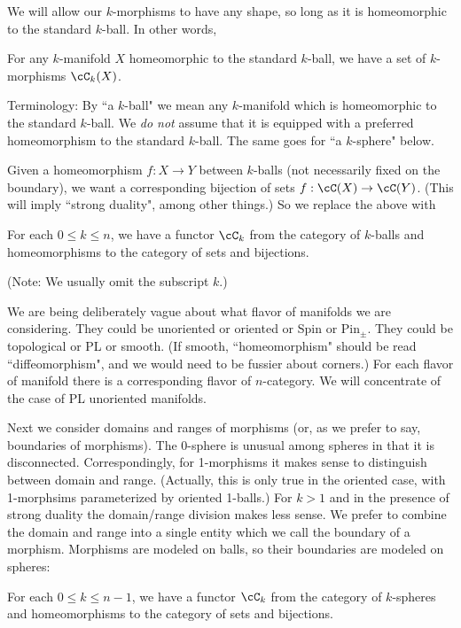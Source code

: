 We will allow our $k$-morphisms to have any shape, so long as it is homeomorphic to 
the standard $k$-ball.
In other words,

{For any $k$-manifold $X$ homeomorphic 
to the standard $k$-ball, we have a set of $k$-morphisms
$\cC_k(X)$.}

Terminology: By ``a $k$-ball" we mean any $k$-manifold which is homeomorphic to the 
standard $k$-ball.
We {\it do not} assume that it is equipped with a 
preferred homeomorphism to the standard $k$-ball.
The same goes for ``a $k$-sphere" below.


Given a homeomorphism $f:X\to Y$ between $k$-balls (not necessarily fixed on 
the boundary), we want a corresponding
bijection of sets $f:\cC(X)\to \cC(Y)$.
(This will imply ``strong duality", among other things.)
So we replace the above with

{For each $0 \le k \le n$, we have a functor $\cC_k$ from 
the category of $k$-balls and 
homeomorphisms to the category of sets and bijections.}

(Note: We usually omit the subscript $k$.)

We are being deliberately vague about what flavor of manifolds we are considering.
They could be unoriented or oriented or Spin or $\mbox{Pin}_\pm$.
They could be topological or PL or smooth.
(If smooth, ``homeomorphism" should be read ``diffeomorphism", and we would need
to be fussier about corners.)
For each flavor of manifold there is a corresponding flavor of $n$-category.
We will concentrate of the case of PL unoriented manifolds.

Next we consider domains and ranges of morphisms (or, as we prefer to say, boundaries
of morphisms).
The 0-sphere is unusual among spheres in that it is disconnected.
Correspondingly, for 1-morphisms it makes sense to distinguish between domain and range.
(Actually, this is only true in the oriented case, with 1-morphsims parameterized
by oriented 1-balls.)
For $k>1$ and in the presence of strong duality the domain/range division makes less sense.
We prefer to combine the domain and range into a single entity which we call the 
boundary of a morphism.
Morphisms are modeled on balls, so their boundaries are modeled on spheres:

{For each $0 \le k \le n-1$, we have a functor $\cC_k$ from 
the category of $k$-spheres and 
homeomorphisms to the category of sets and bijections.}

